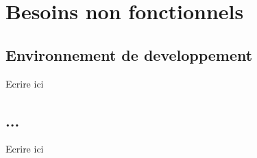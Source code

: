 \chapter{Besoins non fonctionnels}

\section{Environnement de developpement}
Ecrire ici

\section{...}
Ecrire ici




\clearpage
